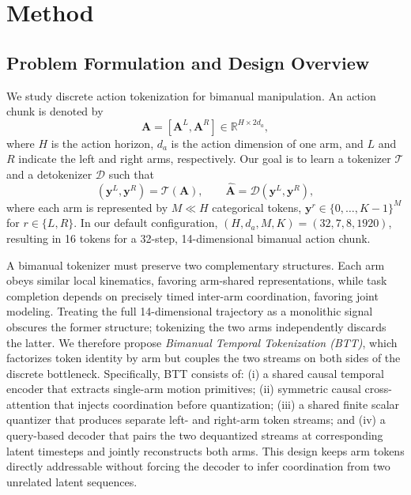\section{Method}
\label{sec:method}

\subsection{Problem Formulation and Design Overview}
\label{sec:method_overview}

We study discrete action tokenization for bimanual manipulation.  An action
chunk is denoted by
\begin{equation}
    \mathbf{A}
    = [\mathbf{A}^{L},\mathbf{A}^{R}]
    \in \mathbb{R}^{H\times 2d_a},
\end{equation}
where $H$ is the action horizon, $d_a$ is the action dimension of one arm, and
$L$ and $R$ indicate the left and right arms, respectively.  Our goal is to
learn a tokenizer $\mathcal{T}$ and a detokenizer $\mathcal{D}$ such that
\begin{equation}
    (\mathbf{y}^{L},\mathbf{y}^{R}) = \mathcal{T}(\mathbf{A}),
    \qquad
    \widehat{\mathbf{A}}
    = \mathcal{D}(\mathbf{y}^{L},\mathbf{y}^{R}),
    \label{eq:btt_mapping}
\end{equation}
where each arm is represented by $M\ll H$ categorical tokens,
$\mathbf{y}^{r}\in\{0,\ldots,K-1\}^{M}$ for
$r\in\{L,R\}$.  In our default configuration,
$(H,d_a,M,K)=(32,7,8,1920)$, resulting in 16 tokens for a 32-step,
14-dimensional bimanual action chunk.

A bimanual tokenizer must preserve two complementary structures.  Each arm
obeys similar local kinematics, favoring arm-shared representations, while task
completion depends on precisely timed inter-arm coordination, favoring joint
modeling.  Treating the full 14-dimensional trajectory as a monolithic signal
obscures the former structure; tokenizing the two arms independently discards
the latter.  We therefore propose \emph{Bimanual Temporal Tokenization (BTT)},
which factorizes token identity by arm but couples the two streams on both
sides of the discrete bottleneck.  Specifically, BTT consists of: (i) a shared
causal temporal encoder that extracts single-arm motion primitives;
(ii) symmetric causal cross-attention that injects coordination before
quantization; (iii) a shared finite scalar quantizer that produces separate
left- and right-arm token streams; and (iv) a query-based decoder that pairs
the two dequantized streams at corresponding latent timesteps and jointly
reconstructs both arms.  This design keeps arm tokens directly addressable
without forcing the decoder to infer coordination from two unrelated latent
sequences.

